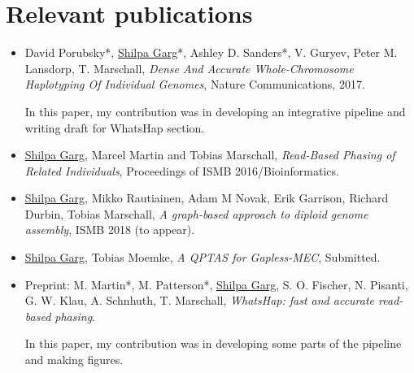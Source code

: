 \section{Relevant publications}
\begin{itemize}
 \item David Porubsky*, \underline{Shilpa Garg}*, Ashley D. Sanders*, V. Guryev, Peter M. Lansdorp, T. Marschall,
\textit{Dense And Accurate Whole-Chromosome Haplotyping Of Individual Genomes}, Nature Communications, 2017.

In this paper, my contribution was in developing an integrative pipeline and writing draft for WhatsHap section.
\item \underline{Shilpa Garg}, Marcel Martin and Tobias Marschall, \textit{Read-Based Phasing of Related Individuals},
Proceedings of ISMB 2016/Bioinformatics.
\item \underline{Shilpa Garg}, Mikko Rautiainen, Adam M Novak, Erik Garrison, Richard Durbin, Tobias Marschall, \textit{A graph-based approach to diploid genome assembly}, ISMB 2018 (to appear).
\item \underline{Shilpa Garg}, Tobias Moemke, \textit{A QPTAS for Gapless-MEC}, Submitted.
\item Preprint: M. Martin*, M. Patterson*, \underline{Shilpa Garg}, S. O. Fischer, N. Pisanti, G. W. Klau, A. Schnhuth, T.
Marschall, \textit{WhatsHap: fast and accurate read-based phasing}.

In this paper, my contribution was in developing some parts of the pipeline and making figures.
\end{itemize}




